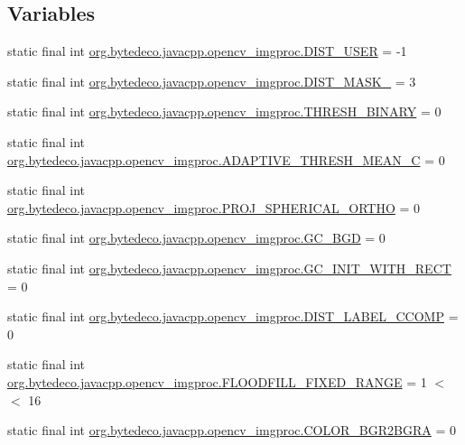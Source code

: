 \subsection*{Variables}
\begin{DoxyCompactItemize}
\item 
static final int \hyperlink{group__imgproc__misc_ga8d734af618e38548a1a6a13d35f7764c}{org.\+bytedeco.\+javacpp.\+opencv\+\_\+imgproc.\+D\+I\+S\+T\+\_\+\+U\+S\+ER} = -\/1
\item 
static final int \hyperlink{group__imgproc__misc_ga2891253337c4f4e497fe2c46d4580771}{org.\+bytedeco.\+javacpp.\+opencv\+\_\+imgproc.\+D\+I\+S\+T\+\_\+\+M\+A\+S\+K\+\_} = 3
\item 
static final int \hyperlink{group__imgproc__misc_ga4a5a1fd195b45fbfe4485dbb0a319fbb}{org.\+bytedeco.\+javacpp.\+opencv\+\_\+imgproc.\+T\+H\+R\+E\+S\+H\+\_\+\+B\+I\+N\+A\+RY} = 0
\item 
static final int \hyperlink{group__imgproc__misc_gaa22bea46672d18b28cbb5f9ec927fca9}{org.\+bytedeco.\+javacpp.\+opencv\+\_\+imgproc.\+A\+D\+A\+P\+T\+I\+V\+E\+\_\+\+T\+H\+R\+E\+S\+H\+\_\+\+M\+E\+A\+N\+\_\+C} = 0
\item 
static final int \hyperlink{group__imgproc__misc_ga019454ab3c5354908ba3f6ee474b67c7}{org.\+bytedeco.\+javacpp.\+opencv\+\_\+imgproc.\+P\+R\+O\+J\+\_\+\+S\+P\+H\+E\+R\+I\+C\+A\+L\+\_\+\+O\+R\+T\+HO} = 0
\item 
static final int \hyperlink{group__imgproc__misc_gac0bdeb696070291d0e46d38bc031fe24}{org.\+bytedeco.\+javacpp.\+opencv\+\_\+imgproc.\+G\+C\+\_\+\+B\+GD} = 0
\item 
static final int \hyperlink{group__imgproc__misc_ga524c8be4a39fddefb7b373e70f87751b}{org.\+bytedeco.\+javacpp.\+opencv\+\_\+imgproc.\+G\+C\+\_\+\+I\+N\+I\+T\+\_\+\+W\+I\+T\+H\+\_\+\+R\+E\+CT} = 0
\item 
static final int \hyperlink{group__imgproc__misc_ga5df0759a4f8c3ca100ff1c8acc20f41e}{org.\+bytedeco.\+javacpp.\+opencv\+\_\+imgproc.\+D\+I\+S\+T\+\_\+\+L\+A\+B\+E\+L\+\_\+\+C\+C\+O\+MP} = 0
\item 
static final int \hyperlink{group__imgproc__misc_gaf99f7c0156c9c4cca823004e9534ba96}{org.\+bytedeco.\+javacpp.\+opencv\+\_\+imgproc.\+F\+L\+O\+O\+D\+F\+I\+L\+L\+\_\+\+F\+I\+X\+E\+D\+\_\+\+R\+A\+N\+GE} = 1 $<$$<$ 16
\item 
static final int \hyperlink{group__imgproc__misc_ga42b2263bdd1223c126d6102a1afc9cf4}{org.\+bytedeco.\+javacpp.\+opencv\+\_\+imgproc.\+C\+O\+L\+O\+R\+\_\+\+B\+G\+R2\+B\+G\+RA} = 0
\end{DoxyCompactItemize}


